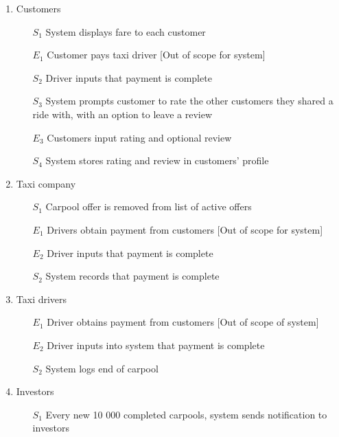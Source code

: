 \documentclass[]{article}
\begin{document}
\begin{enumerate}[{\textbf{BE}}1.]
    \begin{enumerate}[{\textbf{VP6}}.1]
        \item Customers
            \begin{enumerate}
                \item[$S_1$] System displays fare to each customer
                \item[$E_1$] Customer pays taxi driver [Out of scope for system]
		   \item[$S_2$] Driver inputs that payment is complete
                \item[$S_3$] System prompts customer to rate the other customers they shared a ride with, with an option to leave a review
                \item[$E_3$] Customers input rating and optional review
                \item[$S_4$] System stores rating and review in customers’ profile
            \end{enumerate}
        \item Taxi company
            \begin{enumerate}
                \item[$S_1$] Carpool offer is removed from list of active offers
                \item[$E_1$] Drivers obtain payment from customers [Out of scope for system]
                \item[$E_2$] Driver inputs that payment is complete
		\item[$S_2$] System records that payment is complete
            \end{enumerate}
        \item Taxi drivers
            \begin{enumerate}
                \item[$E_1$] Driver obtains payment from customers [Out of scope of system]
                \item[$E_2$] Driver inputs into system that payment is complete
                \item[$S_2$] System logs end of carpool
            \end{enumerate}
        \item Investors
            \begin{enumerate}
		\color{blue}
                \item[$S_1$] Every new 10 000 completed carpools, system sends notification to investors
		\color{black}
            \end{enumerate}

\end{enumerate}
\end{enumerate}
\end{document}
